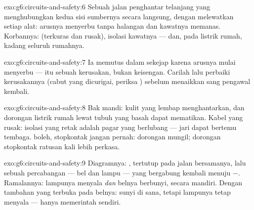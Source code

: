 \begin{solution}{exo:g6:circuits-and-safety:6}
Sebuah jalan penghantar telanjang yang menghubungkan kedua sisi
sumbernya secara langsung, dengan melewatkan setiap alat: arusnya
menyerbu tanpa halangan dan kawatnya memanas. Korbannya: 
(terkuras dan rusak), isolasi kawatnya --- dan, pada listrik rumah,
kadang seluruh rumahnya.
\end{solution}

\begin{solution}{exo:g6:circuits-and-safety:7}
Ia memutus  dalam sekejap karena arusnya mulai menyerbu ---
itu sebuah kerusakan, bukan keisengan. Carilah lalu perbaiki
kerusakannya (cabut yang dicurigai, periksa ) sebelum
menaikkan sang pengawal kembali.
\end{solution}

\begin{solution}{exo:g6:circuits-and-safety:8}
Bak mandi: kulit yang lembap menghantarkan, dan dorongan listrik rumah
lewat tubuh yang basah dapat mematikan. Kabel yang rusak: isolasi yang
retak adalah pagar yang berlubang --- jari dapat bertemu tembaga.
 boleh, stopkontak jangan pernah: dorongan  mungil;
dorongan stopkontak ratusan kali lebih perkasa.
\end{solution}

\begin{solution}{exo:g6:circuits-and-safety:9}
Diagramnya: ,  tertutup pada jalan bersamanya, lalu
sebuah percabangan ---  bel dan  lampu --- yang bergabung
kembali menuju $-$. Ramalannya: lampunya menyala \emph{dan} belnya
berbunyi, secara mandiri. Dengan  tambahan yang terbuka pada
 belnya: sunyi di sana, tetapi lampunya tetap menyala --- 
 hanya memerintah  sendiri.
\end{solution}

